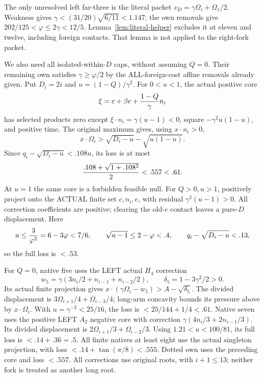 \documentclass[11pt]{article}
\begin{document}
The only unresolved left far-three is the literal packet
\(v_D=\gamma\Omega_i+\Omega_1/2\).
Weakness gives \(\gamma<(31/20)\sqrt{6/11}<1.147\);
the own removals give
\(202/125<\varphi\le2\gamma<12/5\).
Lemma~\ref{lem:literal-helper} excludes it at eleven
and twelve, including foreign contacts.
That lemma is not applied to the right-fork packet.

We also need all isolated-within-\(D\) caps, without
assuming \(Q=0\).
Their remaining own satisfies \(\gamma\ge\varphi/2\)
by the ALL-foreign-cost affine removals already given.
Put \(D_i=2i\) and \(u=(1-Q)/\gamma^2\).
For \(0<u<1\), the actual positive core
\[
 \xi=c+\beta e+{1-Q\over\gamma}n_i
\]
has selected products zero except
\(\xi\cdot n_i=\gamma(u-1)<0\), square
\(-\gamma^2u(1-u)\), and positive time.
The original maximum gives, using \(x\cdot n_i>0\),
\[
 x\cdot\Omega_i>
       \sqrt{D_i-u}-\sqrt{u(1-u)} .
\]
Since \(q_i-\sqrt{D_i-u}<.108u\), its loss is at most
\[
                {.108+\sqrt{1+.108^2}\over2}<.557<.61 .
\]
At \(u=1\) the same core is a forbidden feasible null.
For \(Q>0,u>1\), positively project onto the ACTUAL
finite set \(c,n_i,e\), with residual
\(\gamma^2(u-1)>0\).
All correction coefficients are positive; clearing the
old-\(e\) contact leaves a pure-\(D\) displacement.
Here
\[
 u\le{3\over\varphi^2}=6-3\varphi<7/6,\qquad
 \sqrt{u-1}\le2-\varphi<.4,\qquad
 q_i-\sqrt{D_i-u}<.13 ,
\]
so the full loss is \(<.53\).

For \(Q=0\), native five uses the LEFT actual \(H_4\)
correction
\[
 w_5=\gamma(3n_i/2+n_{i-1}+n_{i-2}/2),\qquad
 \delta_5=1-3\gamma^2/2>0 .
\]
Its actual finite projection gives
\(x\cdot(\gamma\Omega_i-w_5)>A-\sqrt{\delta_5}\).
The divided displacement is
\(3\Omega_{i+1}/4+\Omega_{i-3}/4\);
long-arm concavity bounds its pressure above by
\(x\cdot\Omega_i\).
With \(u=\gamma^{-2}<25/16\), the loss is
\(<25/144+1/4<.61\).
Native seven uses the positive LEFT \(A_2\) negative
core with correction
\(\gamma(4n_i/3+2n_{i-1}/3)\).
Its divided displacement is
\(2\Omega_{i+1}/3+\Omega_{i-2}/3\).
Using \(1.21<u<100/81\), its full loss is
\(<.14+.36=.5\).
All finite natives at least eight use the actual singleton
projection, with loss
\(<.14+\tan(\pi/8)<.555\).
Dotted own uses the preceding core and loss \(<.557\).
All corrections use original roots, with \(i+1\le13\);
neither fork is treated as another long root.
\end{document}
